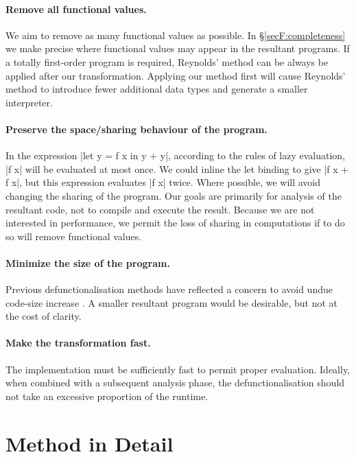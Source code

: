 \paragraph{Remove all functional values.} We aim to remove as many functional values as possible. In \S\ref{secF:completeness} we make precise where functional values may appear in the resultant programs. If a totally first-order program is required, Reynolds' method can be always be applied after our transformation. Applying our method first will cause Reynolds' method to introduce fewer additional data types and generate a smaller interpreter.

\paragraph{Preserve the space/sharing behaviour of the program.} In the expression |let y = f x in y + y|, according to the rules of lazy evaluation, |f x| will be evaluated at most once. We could inline the let binding to give |f x + f x|, but this expression evaluates |f x| twice. Where possible, we will avoid changing the sharing of the program. Our goals are primarily for analysis of the resultant code, not to compile and execute the result. Because we are not interested in performance, we permit the loss of sharing in computations if to do so will remove functional values.

\paragraph{Minimize the size of the program.} Previous defunctionalisation methods have reflected a concern to avoid undue code-size increase \cite{chin:higher_order_removal}. A smaller resultant program would be desirable, but not at the cost of clarity.

\paragraph{Make the transformation fast.} The implementation must be sufficiently fast to permit proper evaluation. Ideally, when combined with a subsequent analysis phase, the defunctionalisation should not take an excessive proportion of the runtime.


\section{Method in Detail}
\label{secF:detailed}

\begin{comment}
\begin{code}
data Prog = Prog deriving Eq
simplify,arity,inline,specialise :: Prog -> Prog
\end{code}
\end{comment}

